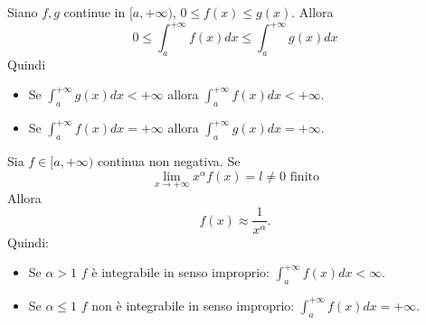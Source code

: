 \begin{proprieta}
    Siano $f,g$ continue in $[a, +\infty)$, $0\leq f(x)\leq g(x)$.
    Allora
    \begin{equation}
        0\leq \int_{a}^{+\infty} f(x) dx \leq \int_{a}^{+\infty} g(x) dx
    \end{equation}
    Quindi
    \begin{itemize}
        \item Se $\int_{a}^{+\infty} g(x) dx < +\infty$ allora $\int_{a}^{+\infty} f(x) dx < +\infty$.
        \item Se $\int_{a}^{+\infty} f(x) dx = +\infty$ allora $\int_{a}^{+\infty} g(x) dx = +\infty$.
    \end{itemize}
\end{proprieta}

\begin{proprieta}
    Sia $f\in [a, +\infty)$ continua non negativa. Se
    \begin{equation}
        \lim_{x\to +\infty}x^\alpha f(x) = l\not= 0 \text{ finito}
    \end{equation}
    Allora
    \begin{equation}
        f(x) \approx \frac{1}{x^\alpha}.
    \end{equation}
    Quindi:
    \begin{itemize}
        \item Se $\alpha > 1$ $f$ è integrabile in senso improprio: $\int_{a}^{+\infty} f(x) dx < \infty$.
        \item Se $\alpha \leq 1$ $f$ non è integrabile in senso improprio: $\int_{a}^{+\infty} f(x) dx = +\infty$.
    \end{itemize}
\end{proprieta}


